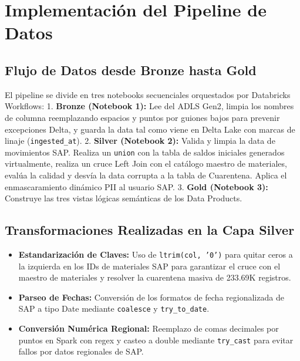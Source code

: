 \documentclass[11pt,a4paper]{article}
\begin{document}
\newpage
\section{Implementación del Pipeline de Datos}

\subsection{Flujo de Datos desde Bronze hasta Gold}
El pipeline se divide en tres notebooks secuenciales orquestados por Databricks Workflows:
1. \textbf{Bronze (Notebook 1):} Lee del ADLS Gen2, limpia los nombres de columna reemplazando espacios y puntos por guiones bajos para prevenir excepciones Delta, y guarda la data tal como viene en Delta Lake con marcas de linaje (\texttt{ingested\_at}).
2. \textbf{Silver (Notebook 2):} Valida y limpia la data de movimientos SAP. Realiza un \texttt{union} con la tabla de saldos iniciales generados virtualmente, realiza un cruce Left Join con el catálogo maestro de materiales, evalúa la calidad y desvía la data corrupta a la tabla de Cuarentena. Aplica el enmascaramiento dinámico PII al usuario SAP.
3. \textbf{Gold (Notebook 3):} Construye las tres vistas lógicas semánticas de los Data Products.

\subsection{Transformaciones Realizadas en la Capa Silver}
\begin{itemize}
    \item \textbf{Estandarización de Claves:} Uso de \texttt{ltrim(col, '0')} para quitar ceros a la izquierda en los IDs de materiales SAP para garantizar el cruce con el maestro de materiales y resolver la cuarentena masiva de 233.69K registros.
    \item \textbf{Parseo de Fechas:} Conversión de los formatos de fecha regionalizada de SAP a tipo Date mediante \texttt{coalesce} y \texttt{try\_to\_date}.
    \item \textbf{Conversión Numérica Regional:} Reemplazo de comas decimales por puntos en Spark con regex y casteo a double mediante \texttt{try\_cast} para evitar fallos por datos regionales de SAP.
\end{itemize}
\end{document}

